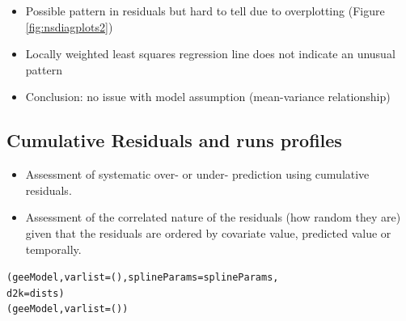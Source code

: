 \begin{frame}
\begin{itemize}
\item Possible pattern in residuals but hard to tell due to overplotting (Figure \ref{fig:nsdiagplots2})
\item Locally weighted least squares regression line does not indicate an unusual pattern
\pause
\bigskip
\item Conclusion: no issue with model assumption (mean-variance relationship)
\end{itemize}
\end{frame}

\subsection{Cumulative Residuals and runs profiles}

\begin{frame}[fragile]
\begin{itemize}
\item Assessment of systematic over- or under- prediction using cumulative residuals.
\item Assessment of the correlated nature of the residuals (how random they are) given that the residuals are ordered by covariate value, predicted value or temporally.
\end{itemize}

\begin{knitrout}\footnotesize
{}\color{fgcolor}\begin{kframe}
\begin{alltt}
(geeModel, varlist=(), splineParams=splineParams, 
    d2k=dists)
(geeModel, varlist=())
\end{alltt}
\end{kframe}
\end{knitrout}

\end{frame}

